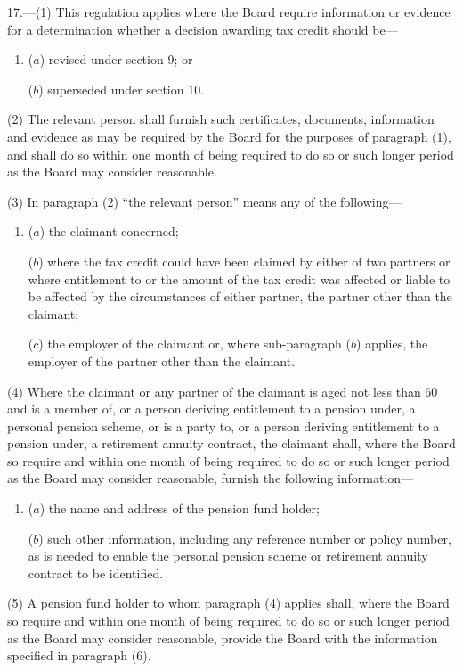 \documentclass[12pt,a4paper]{article}
\begin{document}
17.---(1)  This regulation applies where the Board require information or evidence for a determination whether a decision awarding tax credit should be—
\begin{enumerate}\item[]
($a$) revised under section 9; or

($b$) superseded under section 10.
\end{enumerate}

(2) The relevant person shall furnish such certificates, documents, information and evidence as may be required by the Board for the purposes of paragraph (1), and shall do so within one month of being required to do so or such longer period as the Board may consider reasonable.

(3) In paragraph (2) “the relevant person” means any of the following—
\begin{enumerate}\item[]
($a$) the claimant concerned;

($b$) where the tax credit could have been claimed by either of two partners or where entitlement to or the amount of the tax credit \pagebreak[3] was affected or liable to be affected by the circumstances of either partner, the partner other than the claimant;

($c$) the employer of the claimant or, where sub-paragraph ($b$)  applies, the employer of the partner other than the claimant.
\end{enumerate}

(4) Where the claimant or any partner of the claimant is aged not less than 60 and is a member of, or a person deriving entitlement to a pension under, a personal pension scheme, or is a party to, or a person deriving entitlement to a pension under, a retirement annuity contract, the claimant shall, where the Board so require and within one month of being required to do so or such longer period as the Board may consider reasonable, furnish the following information—
\begin{enumerate}\item[]
($a$) the name and address of the pension fund holder;

($b$) such other information, including any reference number or policy number, as is needed to enable the personal pension scheme or retirement annuity contract to be identified.
\end{enumerate}

\pagebreak[3]

(5) A pension fund holder to whom paragraph (4) applies shall, where the Board so require and within one month of being required to do so or such longer period as the Board may consider reasonable, provide the Board with the information specified in paragraph (6).
\end{document}
